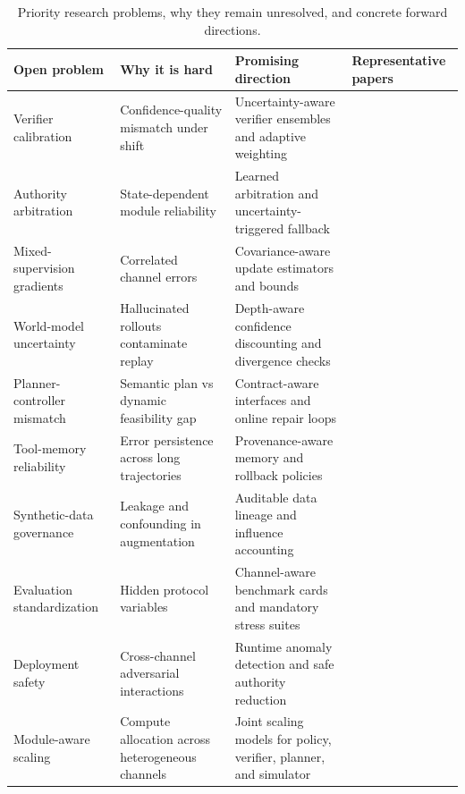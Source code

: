 \documentclass[pdflatex,sn-mathphys-num]{sn-jnl}
\begin{document}
\begin{table}[t]
\centering
\scriptsize
\setlength{\tabcolsep}{3.5pt}
\renewcommand{\arraystretch}{0.96}
\begin{tabularx}{\textwidth}{P{2.1cm}P{2.8cm}P{2.3cm}Y}
\toprule
\textbf{Open problem} & \textbf{Why it is hard} & \textbf{Promising direction} & \textbf{Representative papers}\\
\midrule
Verifier calibration & Confidence-quality mismatch under shift & Uncertainty-aware verifier ensembles and adaptive weighting & \cite{arxiv_p_2602_06493,arxiv_p_2602_12579,arxiv_p_2602_02395}\\
Authority arbitration & State-dependent module reliability & Learned arbitration and uncertainty-triggered fallback & \cite{arxiv_p_2508_03680,arxiv_p_2602_06554,arxiv_p_2601_16486}\\
Mixed-supervision gradients & Correlated channel errors & Covariance-aware update estimators and bounds & \cite{arxiv_p_2602_16165,arxiv_p_2601_06845,arxiv_p_2510_20867}\\
World-model uncertainty & Hallucinated rollouts contaminate replay & Depth-aware confidence discounting and divergence checks & \cite{arxiv_p_2602_02454,arxiv_p_2602_11075,arxiv_p_2602_00785}\\
Planner-controller mismatch & Semantic plan vs dynamic feasibility gap & Contract-aware interfaces and online repair loops & \cite{arxiv_p_2204_01691,arxiv_p_2405_01534,arxiv_p_2512_12716}\\
Tool-memory reliability & Error persistence across long trajectories & Provenance-aware memory and rollback policies & \cite{arxiv_p_2404_03648,arxiv_p_2602_00994,arxiv_p_2601_07264}\\
Synthetic-data governance & Leakage and confounding in augmentation & Auditable data lineage and influence accounting & \cite{arxiv_p_2310_20587,arxiv_p_2601_08107,arxiv_p_2602_02137}\\
Evaluation standardization & Hidden protocol variables & Channel-aware benchmark cards and mandatory stress suites & \cite{arxiv_p_2411_02337,doi_p_10_3390_app14198868,arxiv_p_2510_16720}\\
Deployment safety & Cross-channel adversarial interactions & Runtime anomaly detection and safe authority reduction & \cite{arxiv_p_2512_05686,arxiv_p_2602_09367,arxiv_p_2602_13156}\\
Module-aware scaling & Compute allocation across heterogeneous channels & Joint scaling models for policy, verifier, planner, and simulator & \cite{arxiv_p_2510_06727,arxiv_p_2601_11658,arxiv_p_2509_02547}\\
\bottomrule
\end{tabularx}
\caption{Priority research problems, why they remain unresolved, and concrete forward directions.}
\label{tab:t7_open}
\end{table}
\end{document}
